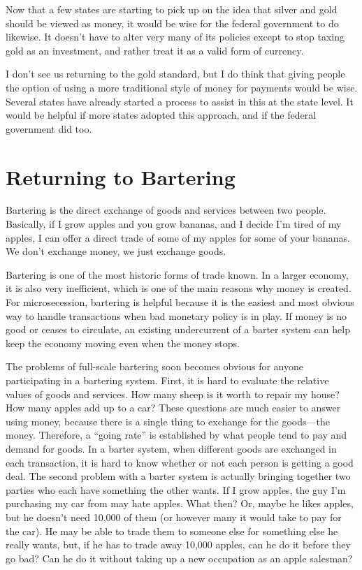 \begin{policynote}
Now that a few states are starting to pick up on the idea that silver
and gold should be viewed as money, it would be wise for the federal
government to do likewise. It doesn’t have to alter very many of its policies except
to stop taxing gold as an investment, and rather treat it as a valid
form of currency.

I don’t see us returning to the gold standard, but I do think that
giving people the option of using a more traditional style of money for
payments would be wise. Several states have already started a process
to assist in this at the state level. It would be helpful if more
states adopted this approach, and if the federal government did too.
\end{policynote}

\section{Returning to Bartering}

Bartering is the direct exchange of goods and services between two people.
Basically, if I grow apples and you grow bananas, and I decide I'm tired
of my apples, I can offer a direct trade of some of my apples for some
of your bananas.  We don't exchange money, we just exchange goods.

Bartering is one of the most historic forms of trade known.  In a 
larger economy, it is also very inefficient, which is one of the 
main reasons why money is created.  For microsecession, bartering
is helpful because it is the easiest and most obvious way to 
handle transactions when bad monetary policy is in play.  If money 
is no good or ceases to circulate, an existing undercurrent of a barter
system can help keep the economy moving even when the money stops.

The problems of full-scale bartering soon becomes obvious for anyone participating
in a bartering system.  First, it is hard to evaluate the relative values
of goods and services.  How many sheep is it worth to repair my house?
How many apples add up to a car?  These questions are much easier to answer
using money, because there is a single thing to exchange for the goods---the money.
Therefore, a ``going rate'' is established by what people tend to pay
and demand for goods.  In a barter system, when different goods are exchanged in each transaction,
it is hard to know whether or not each person is getting a good deal.
The second problem with a barter system is actually bringing together two parties who each have something the other wants.
If I grow apples, the guy I'm purchasing my car from may hate apples.  What then?
Or, maybe he likes apples, but he doesn't need 10,000 of them (or however many it would
take to pay for the car).  He may be able to trade them to someone else for something
else he really wants, but, if he has to trade away 10,000 apples, can he do it 
before they go bad?  Can he do it without taking up a new occupation as an apple
salesman?

